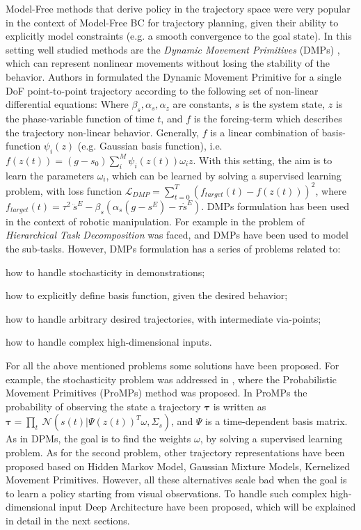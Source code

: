 Model-Free methods that derive policy in the trajectory space were very popular in the context of Model-Free BC for trajectory planning, given their ability to explicitly model constraints (e.g. a smooth convergence to the goal state). In this setting well studied methods are the \textit{Dynamic Movement Primitives} (DMPs) \cite{ijspeert2002learning,ijspeert2013dynamical}, which can represent nonlinear movements without losing the stability of the behavior.  
Authors in \cite{ijspeert2013dynamical} formulated the Dynamic Movement Primitive for a single DoF point-to-point trajectory according to the following set of non-linear differential equations:  Where $\beta_{s}, \alpha_{s}, \alpha_{z}$ are constants, $s$ is the system state, $z$ is the phase-variable function of time $t$, and $f$ is the forcing-term which describes the trajectory non-linear behavior. Generally, $f$ is a linear combination of basis-function $\psi_{i}(z)$ (e.g. Gaussian basis function), i.e. $f(z(t)) = (g-s_{0}) \sum_{i}^{M}\psi_{i}(z(t))\omega_{i}z$. With this setting, the aim is to learn the parameters $\omega_{i}$, which can be learned by solving a supervised learning problem, with loss function $\mathcal{L}_{DMP} = \sum_{t=0}^{T}(f_{target}(t) - f(z(t)))^{2}$, where $f_{target}(t) = \tau^{2} \ \ddot{s}^{E} - \beta_{s}(\alpha_{s}(g - s^{E})-\tau \dot{s}^{E})$. DMPs formulation has been used in the context of robotic manipulation. For example in \cite{caccavale2019kinesthetic,eiband2019learning,agostini2020manipulation} the problem of \textit{Hierarchical Task Decomposition} was faced, and DMPs have been used to model the sub-tasks. However, DMPs formulation has a series of problems related to: \begin{enumerate*}[label=(\textbf{\alph*})]
    \item how to handle stochasticity in demonstrations;
    \item how to explicitly define basis function, given the desired behavior;
    \item how to handle arbitrary desired trajectories, with intermediate via-points;
    \item how to handle complex high-dimensional inputs. 
\end{enumerate*}
For all the above mentioned problems some solutions have been proposed. For example, the stochasticity problem was addressed in \cite{paraschos2013ProMPs}, where the Probabilistic Movement Primitives (ProMPs) method was proposed. In ProMPs the probability of observing the state a trajectory $\boldsymbol{\tau}$ is written as $\boldsymbol{\tau} = \underset{t}{\prod} \ \mathcal{N}(s(t)|\Psi(z(t))^{T}\omega, \Sigma_{s})$, and $\Psi$ is a time-dependent basis matrix. As in DPMs, the goal is to find the weights $\omega$, by solving a supervised learning problem. As for the second problem, other trajectory representations have been proposed based on Hidden Markov Model, Gaussian Mixture Models, Kernelized Movement Primitives. However, all these alternatives scale bad when the goal is to learn a policy starting from visual observations. To handle such complex high-dimensional input Deep Architecture have been proposed, which will be explained in detail in the next sections. 
